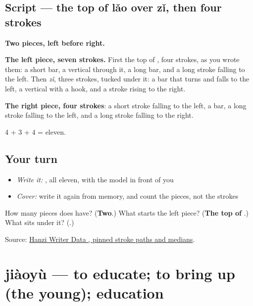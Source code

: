 \subsection*{Script — the top of lǎo over zǐ, then four strokes}

\begin{quote}
\end{quote}

\textbf{Two pieces, left before right.}

\textbf{The left piece, seven strokes.} First the top of , four strokes, as you wrote them: a short bar, a vertical through it, a long bar, and a long stroke falling to the left. Then  \emph{zǐ}, three strokes, tucked under it: a bar that turns and falls to the left, a vertical with a hook, and a stroke rising to the right.

\textbf{The right piece, four strokes}: a short stroke falling to the left, a bar, a long stroke falling to the left, and a long stroke falling to the right.

4 + 3 + 4 = eleven.

\subsection*{Your turn}
\begin{itemize}
\raggedright
  \item \emph{Write it:} , all eleven, with the model in front of you
  \item \emph{Cover:} write it again from memory, and count the pieces, not the strokes
\end{itemize}

\begin{tcolorbox}[breakable,colback=teal!4,colframe=teal!35!black,title={Before you move on}]
How many pieces does  have? (\textbf{Two}.) What starts the left piece? (\textbf{The top of }.) What sits under it? (\textbf{}.)

Source: \href{https://raw.githubusercontent.com/chanind/hanzi-writer-data/68d10a4b21150cae5e1ebbd223eed289cf32d90c/data/\%E6\%95\%99.json}{Hanzi Writer Data , pinned stroke paths and medians}.
\end{tcolorbox}
\section[jiàoyù]{jiàoyù — to educate; to bring up (the young); education}


